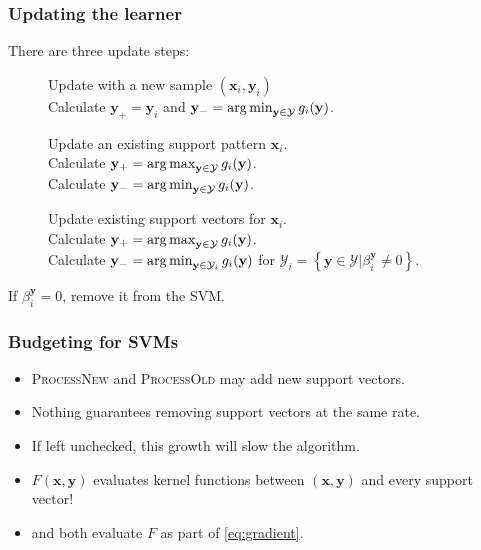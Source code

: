 \begin{frame}
    \frametitle{Updating the learner}
    There are three update steps:
    \begin{description}
        \item [\processNew] Update with a new sample \(\left(\mathbf{x}_i, \mathbf{y}_i\right)\) \\
            Calculate \(\mathbf{y}_+ = \mathbf{y}_i\) and \(\mathbf{y}_- = \operatorname*{arg\,min}_{\mathbf{y} \in
            \mathcal{Y}} g_i(\mathbf{y})\).
        \item [\processOld] Update an existing support pattern \(\mathbf{x}_i\). \\
            Calculate \(\mathbf{y}_+ = \operatorname*{arg\,max}_{\mathbf{y} \in \mathcal{Y}} g_i(\mathbf{y})\). \\
            Calculate \(\mathbf{y}_- = \operatorname*{arg\,min}_{\mathbf{y} \in \mathcal{Y}} g_i(\mathbf{y})\).
        \item [\optimize] Update existing support vectors for \(\mathbf{x}_i\). \\
            Calculate \(\mathbf{y}_+ = \operatorname*{arg\,max}_{\mathbf{y} \in \mathcal{Y}} g_i(\mathbf{y})\). \\
            Calculate \(\mathbf{y}_- = \operatorname*{arg\,min}_{\mathbf{y} \in \mathcal{Y}_i} g_i(\mathbf{y})\) for
            \(\mathcal{Y}_i = \left\{\mathbf{y} \in \mathcal{Y} | \beta_i^\mathbf{y} \ne 0
            \right\}\).
    \end{description}
    If \(\beta_i^\mathbf{y} = 0\), remove it from the SVM.
\end{frame}

\begin{frame}
    \frametitle{Budgeting for SVMs}
    \begin{itemize}
        \item \textsc{ProcessNew} and \textsc{ProcessOld} may add new support vectors.
        \item Nothing guarantees removing support vectors at the same rate. 
        \item<2-> If left unchecked, this growth will slow the algorithm.
        \item<2-> \(F(\mathbf{x}, \mathbf{y})\) evaluates kernel functions between \((\mathbf{x},
            \mathbf{y})\) and every support vector!
        \item<2-> \processNew and \processOld both evaluate \(F\) as part of \eqref{eq:gradient}.
    \end{itemize}

\end{frame}

